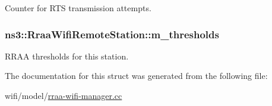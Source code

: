 Counter for R\+TS transmission attempts. 

\subsubsection[{\texorpdfstring{m\+\_\+thresholds}{m_thresholds}}]{ ns3\+::\+Rraa\+Wifi\+Remote\+Station\+::m\+\_\+thresholds}\hypertarget{structns3_1_1RraaWifiRemoteStation_a4842142c3da4fce162def309b6cb8829}{}\label{structns3_1_1RraaWifiRemoteStation_a4842142c3da4fce162def309b6cb8829}


R\+R\+AA thresholds for this station. 



The documentation for this struct was generated from the following file\+:\begin{DoxyCompactItemize}
\item 
wifi/model/\hyperlink{rraa-wifi-manager_8cc}{rraa-\/wifi-\/manager.\+cc}\end{DoxyCompactItemize}
